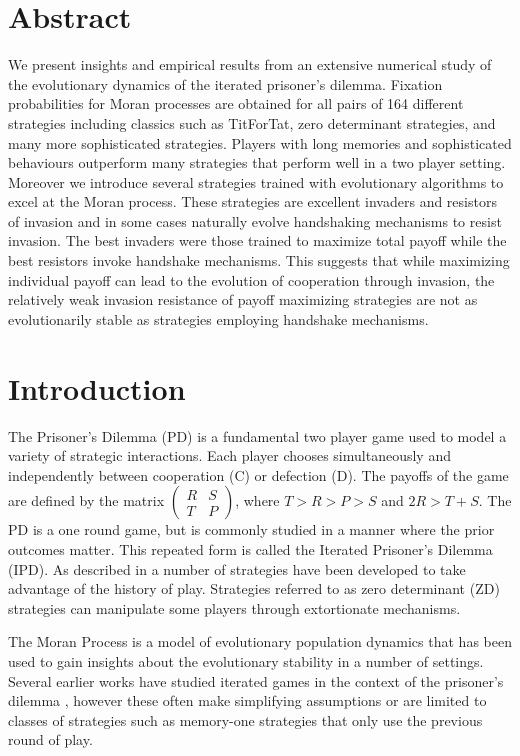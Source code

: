 \documentclass[10pt,letterpaper]{article}
\begin{document}
\section*{Abstract}
    We present insights and empirical results from an extensive numerical
    study of the evolutionary dynamics of the iterated prisoner's dilemma.
    Fixation probabilities for Moran processes are obtained
    for all pairs of 164 different strategies including classics such as TitForTat, zero
    determinant strategies, and many more sophisticated strategies.
    Players with long memories and sophisticated behaviours outperform
    many strategies that perform well in a two player setting. Moreover we
    introduce several strategies trained with evolutionary algorithms to
    excel at the Moran process. These strategies are excellent invaders
    and resistors of invasion and in some cases naturally evolve handshaking
    mechanisms to resist invasion. The best invaders were those trained
    to maximize total payoff while the best resistors invoke handshake mechanisms.
    This suggests that while maximizing individual payoff
    can lead to the evolution of cooperation through invasion, the relatively
    weak invasion resistance of payoff maximizing strategies are not as
    evolutionarily stable as strategies employing handshake mechanisms.
\linenumbers

\section*{Introduction}

The Prisoner's Dilemma (PD) \cite{Flood1958} is a fundamental two player game
used to model a variety of strategic interactions. Each player chooses
simultaneously and independently
between cooperation (C) or defection (D). The payoffs of
the game are defined by the matrix $\begin{pmatrix} R & S \\ T & P
\end{pmatrix}$, where $T > R > P > S$ and $2R > T + S$. The PD is a one
round game, but is commonly studied in a manner where the prior outcomes
matter. This repeated form is called the Iterated Prisoner's
Dilemma (IPD). As described in \cite{Axelrod1980a, Knight2016, Press2012} a
number of strategies have been developed to take advantage of the history of
play. Strategies referred to as zero determinant (ZD) strategies
\cite{Press2012} can manipulate some players through extortionate mechanisms.

The Moran Process \cite{Moran1957} is a model of
evolutionary population dynamics that has been used to gain insights about the
evolutionary stability in a number of settings.
Several earlier
works have studied iterated games in the context of the prisoner's dilemma
\cite{Nowak, stewart2013extortion}, however these often make simplifying assumptions
or are limited to classes of strategies
such as memory-one strategies that only use the previous round of play.
\end{document}
